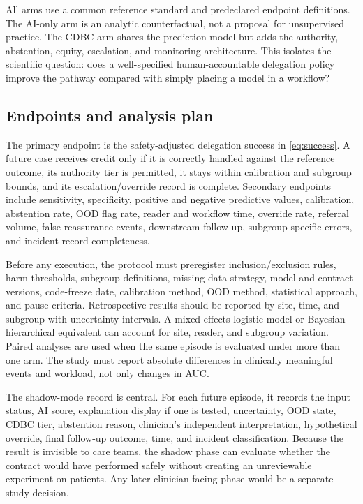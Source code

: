 \documentclass[conference]{IEEEtran}
\begin{document}
All arms use a common reference standard and predeclared endpoint definitions. The AI-only arm is an analytic counterfactual, not a proposal for unsupervised practice. The CDBC arm shares the prediction model but adds the authority, abstention, equity, escalation, and monitoring architecture. This isolates the scientific question: does a well-specified human-accountable delegation policy improve the pathway compared with simply placing a model in a workflow?

\subsection{Endpoints and analysis plan}

The primary endpoint is the safety-adjusted delegation success in \eqref{eq:success}. A future case receives credit only if it is correctly handled against the reference outcome, its authority tier is permitted, it stays within calibration and subgroup bounds, and its escalation/override record is complete. Secondary endpoints include sensitivity, specificity, positive and negative predictive values, calibration, abstention rate, OOD flag rate, reader and workflow time, override rate, referral volume, false-reassurance events, downstream follow-up, subgroup-specific errors, and incident-record completeness.

Before any execution, the protocol must preregister inclusion/exclusion rules, harm thresholds, subgroup definitions, missing-data strategy, model and contract versions, code-freeze date, calibration method, OOD method, statistical approach, and pause criteria. Retrospective results should be reported by site, time, and subgroup with uncertainty intervals. A mixed-effects logistic model or Bayesian hierarchical equivalent can account for site, reader, and subgroup variation. Paired analyses are used when the same episode is evaluated under more than one arm. The study must report absolute differences in clinically meaningful events and workload, not only changes in AUC.

The shadow-mode record is central. For each future episode, it records the input status, AI score, explanation display if one is tested, uncertainty, OOD state, CDBC tier, abstention reason, clinician's independent interpretation, hypothetical override, final follow-up outcome, time, and incident classification. Because the result is invisible to care teams, the shadow phase can evaluate whether the contract would have performed safely without creating an unreviewable experiment on patients. Any later clinician-facing phase would be a separate study decision.
\end{document}
